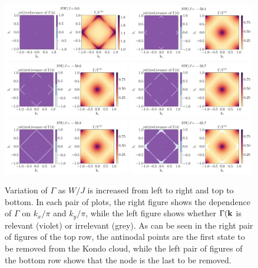 \documentclass[reprint,hidelinks]{revtex4-2}
\begin{document}
\begin{figure}[htpb]
	\centering
	\includegraphics[width=0.49\textwidth]{scattProb-1.pdf}
	\includegraphics[width=0.49\textwidth]{scattProb-2.pdf}\\
	\includegraphics[width=0.49\textwidth]{scattProb-3.pdf}
	\includegraphics[width=0.49\textwidth]{scattProb-4.pdf}\\
	\includegraphics[width=0.49\textwidth]{scattProb-5.pdf}
	\includegraphics[width=0.49\textwidth]{scattProb-6.pdf}
	\caption{Variation of \(\Gamma\) as \(W/J\) is increased from left to right and top to bottom. In each pair of plots, the right figure shows the dependence of \(\Gamma\) on \(k_x/\pi\) and \(k_y/\pi\), while the left figure shows whether \(\Gamma({\bf k}\) is relevant (violet) or irrelevant (grey). As can be seen in the right pair of figures of the top row, the antinodal points are the first state to be removed from the Kondo cloud, while the left pair of figures of the bottom row shows that the node is the last to be removed.}
	\label{gamma_kxky}
\end{figure}
\end{document}
